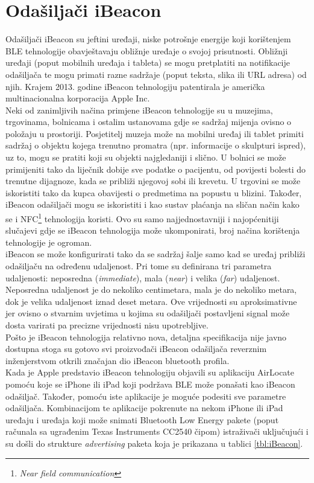 \chapter{Odašiljači iBeacon}

Odašiljači iBeacon su jeftini uređaji, niske potrošnje energije koji korištenjem BLE tehnologije obavještavaju obližnje uređaje o svojoj prisutnosti. 
Obližnji uređaji (poput mobilnih uređaja i tableta) se mogu pretplatiti na notifikacije odašiljača te mogu primati razne sadržaje (poput teksta, slika ili URL adresa) od njih. 
Krajem 2013. godine iBeacon tehnologiju patentirala je američka multinacionalna korporacija Apple Inc.
\\

Neki od zanimljivih načina primjene iBeacon tehnologije su u muzejima, trgovinama, bolnicama i ostalim ustanovama gdje se sadržaj mijenja ovisno o položaju u prostoriji. 
Posjetitelj muzeja može na mobilni uređaj ili tablet primiti sadržaj o objektu kojega trenutno promatra (npr. informacije o skulpturi ispred), uz to, mogu se pratiti koji su objekti najgledaniji i slično. 
U bolnici se može primijeniti tako da liječnik dobije sve podatke o pacijentu, od povijesti bolesti do trenutne dijagnoze, kada se približi njegovoj sobi ili krevetu. 
U trgovini se može iskoristiti tako da kupca obavijesti o predmetima na popustu u blizini. 
Također, iBeacon odašiljači mogu se iskoristiti i kao sustav plaćanja na sličan način kako se i NFC\footnote{\textit{Near field communication}} tehnologija koristi.
Ovo su samo najjednostavniji i najopćenitiji slučajevi gdje se iBeacon tehnologija može ukomponirati, broj načina korištenja tehnologije je ogroman.
\\

iBeacon se može konfigurirati tako da se sadržaj šalje samo kad se uređaj približi odašiljaču na određenu udaljenost. 
Pri tome su definirana tri parametra udaljenosti: neposredna (\textit{immediate}), mala (\textit{near}) i velika (\textit{far}) udaljenost. 
Neposredna udaljenost je do nekoliko centimetara, mala je do nekoliko metara, dok je velika udaljenost iznad deset metara. 
Ove vrijednosti su aproksimativne jer ovisno o stvarnim uvjetima u kojima su odašiljači postavljeni signal može dosta varirati pa precizne vrijednosti nisu upotrebljive.
\\

Pošto je iBeacon tehnologija relativno nova, detaljna specifikacija nije javno dostupna stoga su gotovo svi proizvođači iBeacon odašiljača reverznim inženjerstvom otkrili značajan dio iBeacon bluetooth profila.
\\
Kada je Apple predstavio iBeacon tehnologiju objavili su aplikaciju AirLocate pomoću koje se iPhone ili iPad koji podržava BLE može ponašati kao iBeacon odašiljač. 
Također, pomoću iste aplikacije je moguće podesiti sve parametre odašiljača. 
Kombinacijom te aplikacije pokrenute na nekom iPhone ili iPad uređaju i uređaja koji može snimati Bluetooth Low Energy pakete (poput računala sa ugrađenim Texas Instruments CC2540 čipom) istraživači uključujući i \cite{radiusReverseEng} su došli do strukture \textit{advertising} paketa koja je prikazana u tablici \ref{tbl:iBeacon}.

